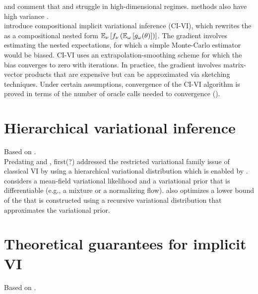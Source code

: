 \documentclass[10pt]{article}
\begin{document}
\citet{Molchanova:2019} and \citet{Moens:2021} comment that \sivi and \uivi struggle in high-dimensional regimes. \mcmc methods also have high variance \citep{Moens:2021}.
\\

\citet{Moens:2021} introduce compositional implicit variational inference (CI-VI), which rewrites the \sivi \elbo as a compositional nested form $\mathbb{E}_\nu\left[f_\nu\left(\mathbb{E}_\omega\left[g_\omega(\theta)\right]\right)\right]$. The gradient involves estimating the nested expectations, for which a simple Monte-Carlo estimator would be biased. CI-VI uses an extrapolation-smoothing scheme for which the bias converges to zero with iterations. In practice, the gradient involves matrix-vector products that are expensive but can be approximated via sketching techniques. Under certain assumptions, convergence of the CI-VI algorithm is proved in terms of the number of oracle calls needed to convergence (\todo).


\section{Hierarchical variational inference}

Based on \citet{Ranganath:2016}.
\\

Predating \sivi and \uivi, \hvm first(?) addressed the restricted variational family issue of classical VI by using a hierarchical variational distribution which is enabled by \bbvi. \hvm considers a mean-field variational likelihood and a variational prior that is differentiable (e.g., a mixture or a normalizing flow). \hvm also optimizes a lower bound of the \elbo that is constructed using a recursive variational distribution that approximates the variational prior.


\newpage


\section{Theoretical guarantees for implicit VI}

Based on \citet{Plummer:2021}.
\\
\end{document}
